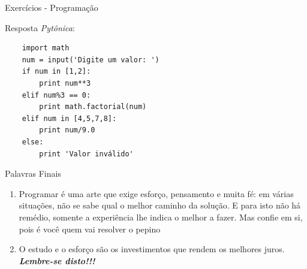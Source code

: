 \documentclass{beamer}
\begin{document}
\begin{frame}[fragile]{Exercícios - Programação}
		\label{exercicio_10_resposta_pytonica}
	
	Resposta \textit{Pytônica}:
	
\begin{verbatim}
	import math
	num = input('Digite um valor: ')
	if num in [1,2]:
		print num**3
	elif num%3 == 0:
		print math.factorial(num)
	elif num in [4,5,7,8]:
		print num/9.0
	else:
		print 'Valor inválido'
\end{verbatim}
	
\end{frame}

\begin{frame}{Palavras Finais}
	\label{palavras_finais}
	
	\begin{enumerate}
		\item Programar é uma arte que exige esforço, pensamento e muita fé: em várias situações, não se sabe qual o melhor caminho da solução. E para isto não há remédio, somente a experiência lhe indica o melhor a fazer. Mas confie em si, pois é você quem vai resolver o pepino
		\item O estudo e o esforço são os investimentos que rendem os melhores juros. \alert{\textbf{\textit{Lembre-se disto!!!}}}
	\end{enumerate}
	
\end{frame}


\backmatter
\end{document}
